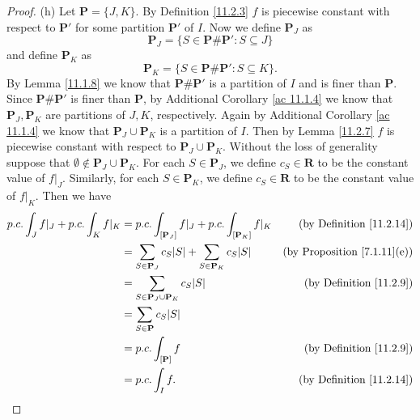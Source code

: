 \begin{proof}{(h)}
    Let \(\mathbf{P} = \{J, K\}\).
    By Definition \ref{11.2.3} \(f\) is piecewise constant with respect to \(\mathbf{P}'\) for some partition \(\mathbf{P}'\) of \(I\).
    Now we define \(\mathbf{P}_J\) as
    \[
        \mathbf{P}_J = \{S \in \mathbf{P} \# \mathbf{P}' : S \subseteq J\}
    \]
    and define \(\mathbf{P}_K\) as
    \[
        \mathbf{P}_K = \{S \in \mathbf{P} \# \mathbf{P}' : S \subseteq K\}.
    \]
    By Lemma \ref{11.1.8} we know that \(\mathbf{P} \# \mathbf{P}'\) is a partition of \(I\) and is finer than \(\mathbf{P}\).
    Since \(\mathbf{P} \# \mathbf{P}'\) is finer than \(\mathbf{P}\), by Additional Corollary \ref{ac 11.1.4} we know that \(\mathbf{P}_J, \mathbf{P}_K\) are partitions of \(J, K\), respectively.
    Again by Additional Corollary \ref{ac 11.1.4} we know that \(\mathbf{P}_J \cup \mathbf{P}_K\) is a partition of \(I\).
    Then by Lemma \ref{11.2.7} \(f\) is piecewise constant with respect to \(\mathbf{P}_J \cup \mathbf{P}_K\).
    Without the loss of generality suppose that \(\emptyset \notin \mathbf{P}_J \cup \mathbf{P}_K\).
    For each \(S \in \mathbf{P}_J\), we define \(c_S \in \mathbf{R}\) to be the constant value of \(f|_J\).
    Similarly, for each \(S \in \mathbf{P}_K\), we define \(c_S \in \mathbf{R}\) to be the constant value of \(f|_K\).
    Then we have
    \begin{align*}
        p.c. \int_J f|_J + p.c. \int_K f|_K & = p.c. \int_{[\mathbf{P}_J]} f|_J + p.c. \int_{[\mathbf{P}_K]} f|_K               & \text{(by Definition \ref{11.2.14})}    \\
                                            & = \sum_{S \in \mathbf{P}_J} c_S \abs*{S} + \sum_{S \in \mathbf{P}_K} c_S \abs*{S} & \text{(by Proposition \ref{7.1.11}(e))} \\
                                            & = \sum_{S \in \mathbf{P}_J \cup \mathbf{P}_K} c_S \abs*{S}                        & \text{(by Definition \ref{11.2.9})}     \\
                                            & = \sum_{S \in \mathbf{P}} c_S \abs*{S}                                                                                      \\
                                            & = p.c. \int_{[\mathbf{P}]} f                                                      & \text{(by Definition \ref{11.2.9})}     \\
                                            & = p.c. \int_I f.                                                                  & \text{(by Definition \ref{11.2.14})}
    \end{align*}
\end{proof}

